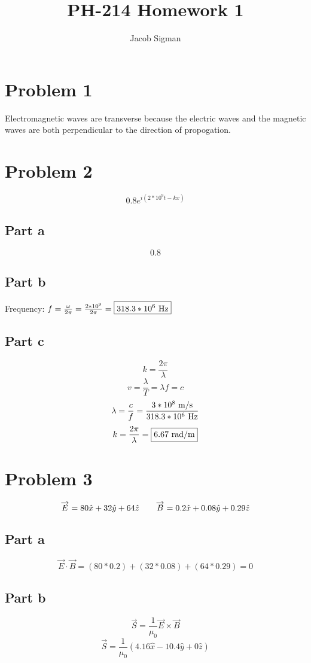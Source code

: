 \documentclass{article}
\title{PH-214 Homework 1}
\author{Jacob Sigman}
\date{}
\begin{document}
\maketitle
\section*{Problem 1}
Electromagnetic waves are transverse because the electric waves and the magnetic waves are both perpendicular to the direction of propogation.
\section*{Problem 2}
\[0.8e^{i\left(2*10^9t-kx\right)}\]
\subsection*{Part a}
\[\boxed{0.8}\]
\subsection*{Part b}
\begin{center}
Frequency: \(f=\frac{\omega}{2\pi}=\frac{2*10^9}{2\pi}=\boxed{318.3*10^6 \textnormal{ Hz}}\)
\end{center}
\subsection*{Part c}
\begin{nscenter}
\[k=\frac{2\pi}{\lambda}\]
\[v=\frac{\lambda}{T}=\lambda f=c\]
\[\lambda=\frac{c}{f}=\frac{3*10^8 \textnormal{ m/s}}{318.3*10^6 \textnormal{ Hz}}\]
\[k=\frac{2\pi}{\lambda}=\boxed{6.67 \textnormal{ rad/m}}\]
\end{nscenter}
\section*{Problem 3}
\[\overrightarrow{E}=80\hat{x}+32\hat{y}+64\hat{z}\hspace{7 mm}\overrightarrow{B}=0.2\hat{x}+0.08\hat{y}+0.29\hat{z}\]
\subsection*{Part a}
\[\overrightarrow{E}\cdot\overrightarrow{B}=(80*0.2)+(32*0.08)+(64*0.29)=\boxed{0}\]
\subsection*{Part b}
\[\overrightarrow{S}=\frac{1}{\mu_0}\overrightarrow{E}\times\overrightarrow{B}\]
\[\overrightarrow{S}=\boxed{\frac{1}{\mu_0}(4.16\hat{x}-10.4\hat{y}+0\hat{z})}\]
\end{document}
